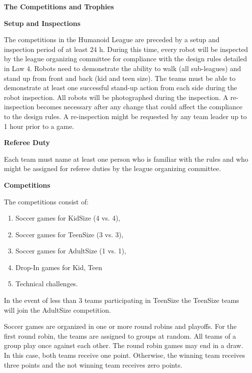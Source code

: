 \clearpage
\sffamily
{\bfseries\color[rgb]{0.4,0.4,0.4}The Competitions and Trophies}

\bigskip

{\bfseries Setup and Inspections}

\headlinebox

The competitions in the Humanoid League are preceded by a setup and inspection period of at least 24 h. During this time, every robot will be inspected by the league organizing committee for compliance with the design rules detailed in Law 4. Robots need to demonstrate the ability to walk (all sub-leagues) and stand up from front and back (kid and teen size). The teams must be able to demonstrate at least one successful stand-up action from each side during the robot inspection. All robots will be photographed during the inspection. A re-inspection becomes necessary after any change that could affect the compliance to the design rules. A re-inspection might be requested by any team leader up to 1 hour prior to a game.

\bigskip

{\bfseries Referee Duty}

\headlinebox

Each team must name at least one person who is familiar with the rules and who might be assigned for referee duties by the league organizing committee.

\bigskip

{\bfseries Competitions}

\headlinebox

The competitions consist of:

\begin{enumerate}
\item Soccer games for KidSize (4 vs. 4),
\item Soccer games for TeenSize (3 vs. 3),
\item Soccer games for AdultSize (1 vs. 1),
\item Drop-In games for Kid, Teen 
\item Technical challenges.
\end{enumerate}

\bigskip

In the event of less than 3 teams participating in TeenSize the TeenSize teams will join the AdultSize competition.

\bigskip

Soccer games are organized in one or more round robins and playoffs. For the first round robin, the teams are assigned to groups at random. All teams of a group play once against each other. The round robin games may end in a draw. In this case, both teams receive one point. Otherwise, the winning team receives three points and the not winning team receives zero points.

